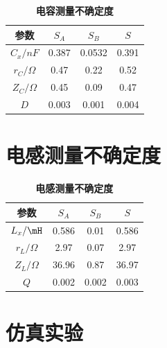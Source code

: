 \documentclass[12pt,a4paper,UTF8]{ctexart}
\begin{document}
\begin{table}[htbp]
    \centering
        \begin{tabular}{cccc}
            \toprule
            参数 &$S_A$ &$S_B$ &$S$   \\
            \midrule
            $C_x/ nF$    &0.387   &0.0532  &0.391 \\
            $r_C/ \Omega$   &0.47   &0.22   &0.52 \\
            $Z_C/ \Omega$   &0.45   &0.09   &0.47 \\
            $D$             &0.003  &0.001  &0.004 \\
            \bottomrule
        \end{tabular}
        \caption{\textbf{电容测量不确定度}}
\end{table}	

\section*{电感测量不确定度}

\begin{table}[htbp]
    \centering
        \begin{tabular}{cccc}
            \toprule
            参数 &$S_A$ &$S_B$ &$S$   \\
            \midrule
            $L_x/ \mH$    &0.586  &0.01   &0.586 \\
            $r_L/ \Omega$   &2.97   &0.07   &2.97 \\
            $Z_L/ \Omega$   &36.96   &0.87   &36.97 \\
            $Q$             &0.002  &0.002  &0.003 \\
            \bottomrule
        \end{tabular}
        \caption{\textbf{电感测量不确定度}}
\end{table}	

\section*{仿真实验}
\end{document}
